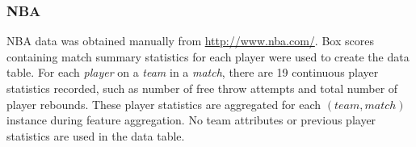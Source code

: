 \documentclass[conference]{IEEEtran}
\newcommand{\team}{T}
\newcommand{\player}{P}
\newcommand{\match}{M}
\begin{document}
\subsubsection{NBA}
NBA data was obtained manually from \url{http://www.nba.com/}. Box scores containing match summary statistics for each player were used to create the data table. For each \textit{player} on a \textit{team} in a \textit{match}, there are 19 continuous player statistics recorded, such as number of free throw attempts and total number of player rebounds. These player statistics are aggregated for each $(team,match)$ instance during feature aggregation. No team attributes or previous player statistics are used in the data table.

%
\end{document}
